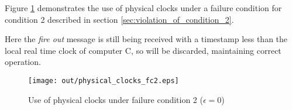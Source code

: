 \documentclass[twocolumn]{article}
\begin{document}
Figure \ref{fig:physical_clocks_fc2} demonstrates the use of physical clocks
under a failure condition for condition 2 described in section
\ref{sec:violation_of_condition_2}.

Here the \textit{fire out} message is still being received with a timestamp less
than the local real time clock of computer C, so will be discarded, maintaining
correct operation.

\begin{figure}[h!]
  \centering
  \texttt{[image: out/physical\_clocks\_fc2.eps]}
  \caption{Use of physical clocks under failure condition 2 ($\epsilon = 0$)}
  \label{fig:physical_clocks_fc2}
\end{figure}
\end{document}
